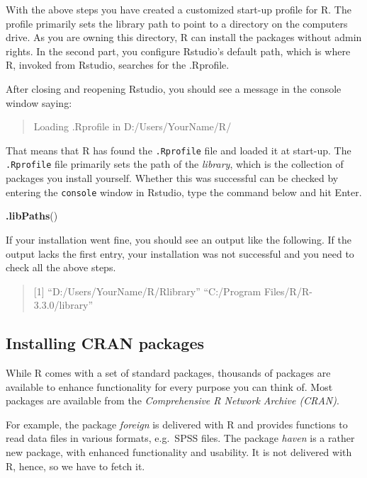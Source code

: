 \documentclass[]{svmono}
\newenvironment{Shaded}{\begin{snugshade}}{\end{snugshade}}
\newcommand{\KeywordTok}[1]{\textcolor[rgb]{0.13,0.29,0.53}{\textbf{#1}}}
\newcommand{\NormalTok}[1]{#1}
\begin{document}
With the above steps you have created a customized start-up profile for
R. The profile primarily sets the library path to point to a directory
on the computers drive. As you are owning this directory, R can install
the packages without admin rights. In the second part, you configure
Rstudio's default path, which is where R, invoked from Rstudio, searches
for the .Rprofile.

After closing and reopening Rstudio, you should see a message in the
console window saying:

\begin{quote}
Loading .Rprofile in D:/Users/YourName/R/
\end{quote}

That means that R has found the \texttt{.Rprofile} file and loaded it at
start-up. The \texttt{.Rprofile} file primarily sets the path of the
\emph{library}, which is the collection of packages you install
yourself. Whether this was successful can be checked by entering the
\texttt{console} window in Rstudio, type the command below and hit
Enter.

\begin{Shaded}
\begin{Highlighting}[]
\KeywordTok{.libPaths}\NormalTok{()}
\end{Highlighting}
\end{Shaded}

If your installation went fine, you should see an output like the
following. If the output lacks the first entry, your installation was
not successful and you need to check all the above steps.

\begin{quote}
{[}1{]} ``D:/Users/YourName/R/Rlibrary'' ``C:/Program
Files/R/R-3.3.0/library''
\end{quote}

\subsection{Installing CRAN packages}\label{installing-cran-packages}

While R comes with a set of standard packages, thousands of packages are
available to enhance functionality for every purpose you can think of.
Most packages are available from the \emph{Comprehensive R Network
Archive (CRAN)}.

For example, the package \emph{foreign} is delivered with R and provides
functions to read data files in various formats, e.g.~SPSS files. The
package \emph{haven} is a rather new package, with enhanced
functionality and usability. It is not delivered with R, hence, so we
have to fetch it.
\end{document}
